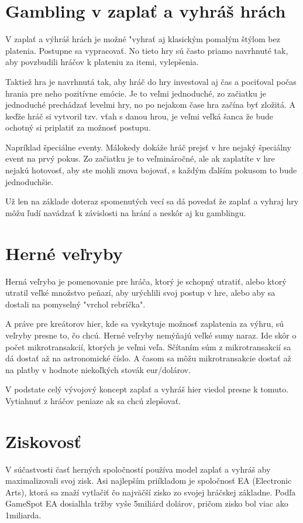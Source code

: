 \documentclass[10pt,twoside,slovak,a4paper]{article}
\begin{document}
\section{Gambling v zaplať a vyhráš hrách}
V zaplať a výhráš hrách je možné "vyhrať aj klasickým pomalým štýlom bez platenia. Postupne sa vypracovať. No tieto hry sú často priamo navrhnuté tak, aby povzbudili hráčov k plateniu za itemi, vylepšenia.

Taktiež hra je navrhnutá tak, aby hráč do hry investoval aj čas a pociťoval počas hrania pre neho pozitívne emócie. Je to veľmi jednoduché, zo začiatku je jednoduché prechádzať levelmi hry, no po nejakom čase hra začína byť zložitá. A keďže hráč si vytvoril tzv. vťah s danou hrou, je veľmi veľká šanca že bude ochotný si priplatiť za možnosť postupu. 

Napríklad špeciálne eventy. Málokedy dokáže hráč prejsť v hre nejaký špeciálny event na prvý pokus. Zo začiatku je to veľmináročné, ale ak zaplatíte v hre nejakú hotovosť, aby ste mohli znova bojovať, s každým ďalším pokusom to bude jednoduchšie.

Už len na základe doteraz spomenutých vecí sa dá povedať že zaplať a vyhraj hry môžu ľudí navádzať k závislosti na hrání a neskôr aj ku gamblingu.


\section{Herné veľryby}
Herná veľryba je pomenovanie pre hráča, ktorý je schopný utratiť, alebo ktorý utratil veľké množstvo peňazí, aby urýchlili svoj postup v hre, alebo aby sa dostali na pomyselný "vrchol rebríčka".

A práve pre kreátorov hier, kde sa vyskytuje možnosť zaplatenia za výhru, sú veľryby presne to, čo chcú.  Herné veľryby nemýňajú veľké sumy naraz. Ide skôr o počet mikrotransakcií, ktorých je veľmi veľa. Sčítaním súm z mikrotransakcií sa dá dostať až na astronomické číslo. A časom sa môžu mikrotransakcie dostať až na platby v hodnote niekoľkých stovák eur/dolárov.

V podstate celý vývojový koncept zaplať a vyhráš hier viedol presne k tomuto. Vytiahnuť z hráčov peniaze ak sa chcú zlepšovať.\cite{3}



\section{Ziskovosť} 
V súčastvosti časť herných spoločností používa model zaplať a vyhráš aby maximalizovali svoj zisk. 
Asi najlepším priíkladom je spoločnosť EA (Electronic Arts), ktorá sa znaží vytlačiť čo najväčší zisko zo svojej hráčskej základne. Podľa GameSpot EA dosialhla tržby vyše 5miliárd dolárov, pričom zisko bol viac ako 1miliarda.
\end{document}
